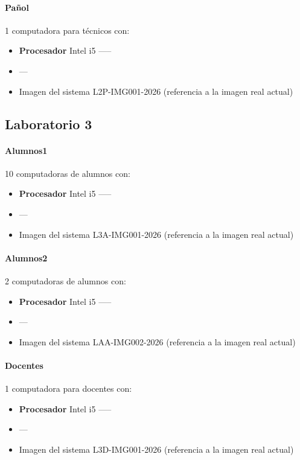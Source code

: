 {\paragraph{Pañol} 1 computadora para técnicos con:
\begin{itemize}
    \item \textbf{Procesador} Intel i5 -----
    \item ---
    \item Imagen del sistema L2P-IMG001-2026 (referencia a la imagen real actual)
\end{itemize}

\subsection{Laboratorio 3}
\paragraph{Alumnos1} 10 computadoras de alumnos con:
\begin{itemize}
    \item \textbf{Procesador} Intel i5 -----
    \item ---
    \item Imagen del sistema L3A-IMG001-2026 (referencia a la imagen real actual)
\end{itemize}

\paragraph{Alumnos2} 2 computadoras de alumnos con:
\begin{itemize}
    \item \textbf{Procesador} Intel i5 -----
    \item ---
    \item Imagen del sistema LAA-IMG002-2026 (referencia a la imagen real actual)
\end{itemize}

\paragraph{Docentes} 1 computadora para docentes con:
\begin{itemize}
    \item \textbf{Procesador} Intel i5 -----
    \item ---
    \item Imagen del sistema L3D-IMG001-2026 (referencia a la imagen real actual)
\end{itemize}

}
